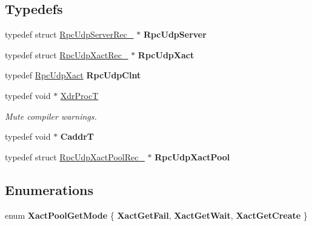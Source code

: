 \subsection*{Typedefs}
\begin{DoxyCompactItemize}
\item 
\mbox{\label{group__rtems-nfsclient_ga6504e6be11266cb0ccd1e4150b3960aa}} 
typedef struct \mbox{\hyperlink{structRpcUdpServerRec__}{Rpc\+Udp\+Server\+Rec\+\_\+}} $\ast$ {\bfseries Rpc\+Udp\+Server}
\item 
\mbox{\label{group__rtems-nfsclient_gafb231b1971cd2477d6a85a339cc4f25c}} 
typedef struct \mbox{\hyperlink{structRpcUdpXactRec__}{Rpc\+Udp\+Xact\+Rec\+\_\+}} $\ast$ {\bfseries Rpc\+Udp\+Xact}
\item 
\mbox{\label{group__rtems-nfsclient_ga18415409c6a8e2f51499d6c074e51665}} 
typedef \mbox{\hyperlink{structRpcUdpXactRec__}{Rpc\+Udp\+Xact}} {\bfseries Rpc\+Udp\+Clnt}
\item 
\mbox{\label{group__rtems-nfsclient_gac22c99bf609cf4f3e1b601de1c157275}} 
typedef void $\ast$ \mbox{\hyperlink{group__rtems-nfsclient_gac22c99bf609cf4f3e1b601de1c157275}{Xdr\+ProcT}}
\begin{DoxyCompactList}\small\item\em Mute compiler warnings. \end{DoxyCompactList}\item 
\mbox{\label{group__rtems-nfsclient_gadb7836f2fe4f005a4a2c7219068fa240}} 
typedef void $\ast$ {\bfseries CaddrT}
\item 
\mbox{\label{group__rtems-nfsclient_ga814f8ce16b14f816906eb60603b3e8c8}} 
typedef struct \mbox{\hyperlink{structRpcUdpXactPoolRec__}{Rpc\+Udp\+Xact\+Pool\+Rec\+\_\+}} $\ast$ {\bfseries Rpc\+Udp\+Xact\+Pool}
\end{DoxyCompactItemize}
\subsection*{Enumerations}
\begin{DoxyCompactItemize}
\item 
\mbox{\label{group__rtems-nfsclient_ga0c5907286d3ddad475819bbc42ed1b7a}} 
enum {\bfseries Xact\+Pool\+Get\+Mode} \{ {\bfseries Xact\+Get\+Fail}, 
{\bfseries Xact\+Get\+Wait}, 
{\bfseries Xact\+Get\+Create}
 \}
\end{DoxyCompactItemize}
